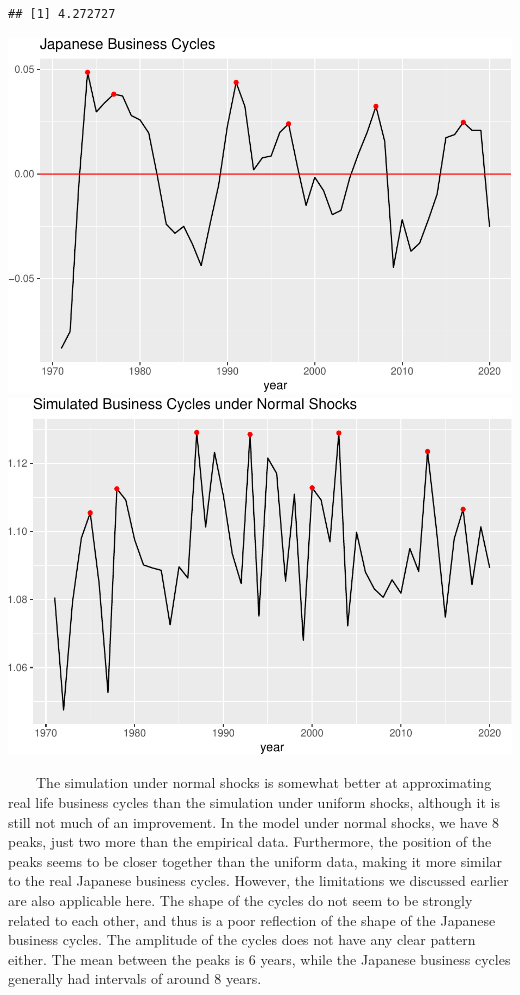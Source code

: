 \documentclass[
]{article}
\newenvironment{Shaded}{\begin{snugshade}}{\end{snugshade}}
\newcommand{\KeywordTok}[1]{\textcolor[rgb]{0.13,0.29,0.53}{\textbf{#1}}}
\newcommand{\NormalTok}[1]{#1}
\newcommand{\OperatorTok}[1]{\textcolor[rgb]{0.81,0.36,0.00}{\textbf{#1}}}
\begin{document}
\begin{Shaded}
\end{Shaded}

\begin{verbatim}
## [1] 4.272727
\end{verbatim}

\includegraphics[width=0.5\linewidth]{rbc_report_files/figure-latex/unnamed-chunk-8-1}
\includegraphics[width=0.5\linewidth]{rbc_report_files/figure-latex/unnamed-chunk-8-2}

~~~~The simulation under normal shocks is somewhat better at
approximating real life business cycles than the simulation under
uniform shocks, although it is still not much of an improvement. In the
model under normal shocks, we have 8 peaks, just two more than the
empirical data. Furthermore, the position of the peaks seems to be
closer together than the uniform data, making it more similar to the
real Japanese business cycles. However, the limitations we discussed
earlier are also applicable here. The shape of the cycles do not seem to
be strongly related to each other, and thus is a poor reflection of the
shape of the Japanese business cycles. The amplitude of the cycles does
not have any clear pattern either. The mean between the peaks is 6
years, while the Japanese business cycles generally had intervals of
around 8 years.
\end{document}
